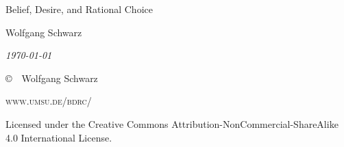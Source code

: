 \documentclass{../wobook2017}
\begin{document}
\begingroup
\thispagestyle{empty}

\begin{center}


{\huge Belief, Desire, and Rational Choice\par}

\vspace{10mm}

{\Large Wolfgang Schwarz}

\vspace{10mm}

{\normalsize \textit{\today}}

\end{center}

\vfill
\endgroup
{
\small

\noindent \copyright\ \the\year\ Wolfgang Schwarz

\noindent \textsc{www.umsu.de/bdrc/}

\noindent Licensed under the Creative Commons Attribution-NonCommercial-ShareAlike 4.0 International License.


%
%

}


\tableofcontents 


\end{document}
